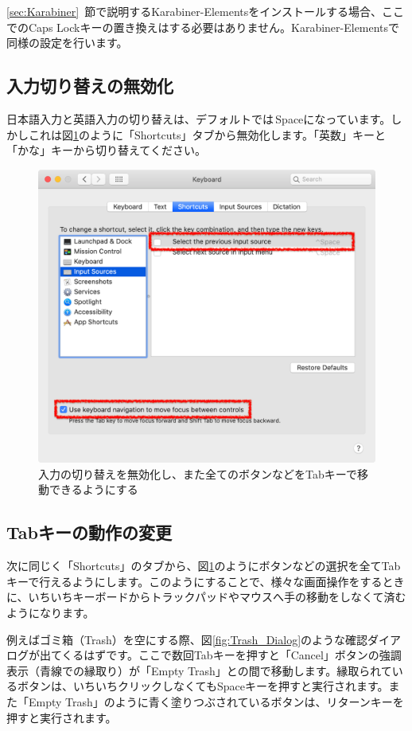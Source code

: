 \ref{sec:Karabiner}~節で説明するKarabiner-Elementsをインストールする場合、ここでのCaps Lockキーの置き換えはする必要はありません。Karabiner-Elementsで同様の設定を行います。

\subsection{入力切り替えの無効化}
日本語入力と英語入力の切り替えは、デフォルトでは\ctlkey\,Spaceになっています。しかしこれは図\ref{fig:Keyboard2}のように「Shortcuts」タブから無効化します。「英数」キーと「かな」キーから切り替えてください。

\begin{figure}
  \centering
  \includegraphics[scale=0.35]{fig/Keyboard2.png}
  \caption{入力の切り替えを無効化し、また全てのボタンなどをTabキーで移動できるようにする}
  \label{fig:Keyboard2}
\end{figure}

\subsection{Tabキーの動作の変更}
次に同じく「Shortcuts」のタブから、図\ref{fig:Keyboard2}のようにボタンなどの選択を全てTabキーで行えるようにします。このようにすることで、様々な画面操作をするときに、いちいちキーボードからトラックパッドやマウスへ手の移動をしなくて済むようになります。

例えばゴミ箱（Trash）を空にする際、図\ref{fig:Trash_Dialog}のような確認ダイアログが出てくるはずです。ここで数回Tabキーを押すと「Cancel」ボタンの強調表示（青線での縁取り）が「Empty Trash」との間で移動します。縁取られているボタンは、いちいちクリックしなくてもSpaceキーを押すと実行されます。また「Empty Trash」のように青く塗りつぶされているボタンは、リターンキーを押すと実行されます。

